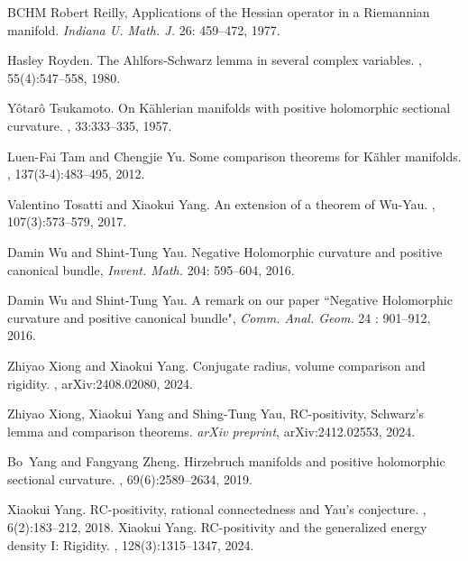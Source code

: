 \documentclass[12pt, reqno]{amsart}
\theoremstyle{plain}
\theoremstyle{definition}
\renewcommand{\>}{\rightarrow}
\renewcommand{\#}{\sharp}
\numberwithin{equation}{section} %
\begin{document}
\begin{thebibliography}{BCHM}
 Robert Reilly, Applications of the Hessian operator in a Riemannian manifold. \emph{Indiana U. Math. J.} 26: 459--472, 1977.



Hasley Royden.
\newblock The {A}hlfors-{S}chwarz lemma in several complex variables.
, 55(4):547--558, 1980.

Y\^otar\^o Tsukamoto.
\newblock On {K}\"ahlerian manifolds with positive holomorphic sectional curvature.
, 33:333--335, 1957.

Luen-Fai Tam and Chengjie Yu.
\newblock Some comparison theorems for {K}\"ahler manifolds.
, 137(3-4):483--495, 2012.

Valentino Tosatti and Xiaokui Yang.
\newblock An extension of a theorem of {W}u-{Y}au.
, 107(3):573--579, 2017.

 Damin Wu and Shint-Tung Yau.  { Negative Holomorphic curvature and positive canonical bundle,} \emph{Invent. Math.} 204: 595--604, 2016.

 Damin Wu and Shint-Tung Yau.  {A remark on our paper ``Negative Holomorphic curvature and positive canonical bundle",} \emph{ Comm. Anal. Geom.} {24} :
901--912, 2016.

Zhiyao Xiong and Xiaokui Yang.
\newblock Conjugate radius, volume comparison and rigidity.
, arXiv:2408.02080, 2024.

 	Zhiyao Xiong, Xiaokui Yang and Shing-Tung Yau,
	RC-positivity, Schwarz's lemma and comparison theorems. {\em arXiv preprint}, {arXiv:2412.02553}, 2024.

Bo~Yang and Fangyang Zheng.
\newblock Hirzebruch manifolds and positive holomorphic sectional curvature.
, 69(6):2589--2634, 2019.

Xiaokui Yang.
\newblock R{C}-positivity, rational connectedness and {Y}au's conjecture.
, 6(2):183--212, 2018.
Xiaokui Yang.
\newblock R{C}-positivity and the generalized energy density {I}: {R}igidity.
, 128(3):1315--1347, 2024.



\end{thebibliography}
\end{document}

